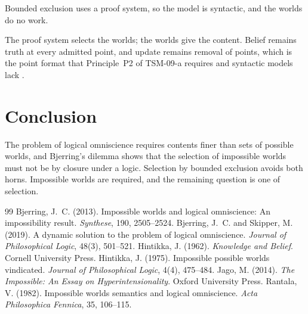 \documentclass{situationist-preprint}
\begin{document}
\begin{objection}
Bounded exclusion uses a proof system, so the model is syntactic, and the worlds do no work.
\end{objection}

\begin{reply}
The proof system selects the worlds; the worlds give the content. Belief remains truth at every admitted point, and update remains removal of points, which is the point format that Principle~P2 of TSM-09-a requires and syntactic models lack \citep{Jago2014}.
\end{reply}

\section{Conclusion}

The problem of logical omniscience requires contents finer than sets of possible worlds, and Bjerring's dilemma shows that the selection of impossible worlds must not be by closure under a logic. Selection by bounded exclusion avoids both horns. Impossible worlds are required, and the remaining question is one of selection.

\begin{thebibliography}{99}\small
{} Bjerring, J.~C. (2013). Impossible worlds and logical omniscience: An impossibility result. \emph{Synthese}, 190, 2505--2524.
 Bjerring, J.~C. and Skipper, M. (2019). A dynamic solution to the problem of logical omniscience. \emph{Journal of Philosophical Logic}, 48(3), 501--521.
 Hintikka, J. (1962). \emph{Knowledge and Belief}. Cornell University Press.
 Hintikka, J. (1975). Impossible possible worlds vindicated. \emph{Journal of Philosophical Logic}, 4(4), 475--484.
 Jago, M. (2014). \emph{The Impossible: An Essay on Hyperintensionality}. Oxford University Press.
 Rantala, V. (1982). Impossible worlds semantics and logical omniscience. \emph{Acta Philosophica Fennica}, 35, 106--115.
\end{thebibliography}
\end{document}
